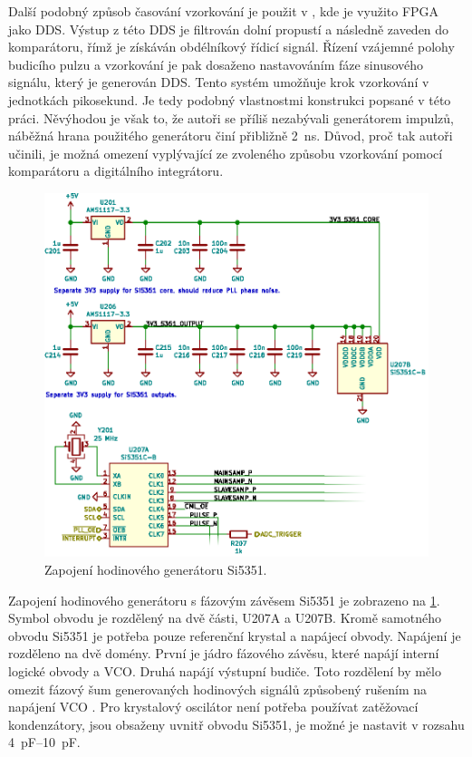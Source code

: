 Další podobný způsob časování vzorkování je použit v \cite{ddsfpgareflectometer}, kde je využito \acrshort{FPGA} jako \acrshort{DDS}. Výstup z této \acrshort{DDS} je filtrován dolní propustí a následně zaveden do komparátoru, římž je získáván obdélníkový řídicí signál. Řízení vzájemné polohy budicího pulzu a vzorkování je pak dosaženo nastavováním fáze sinusového signálu, který je generován \acrshort{DDS}. Tento systém umožňuje krok vzorkování v jednotkách pikosekund. Je tedy podobný vlastnostmi konstrukci popsané v této práci. Něvýhodou je však to, že autoři se příliš nezabývali generátorem impulzů, náběžná hrana použitého generátoru činí přibližně \SI{2}{ns}. Důvod, proč tak autoři učinili, je možná omezení vyplývající ze zvoleného způsobu vzorkování pomocí komparátoru a digitálního integrátoru.

\begin{figure}[htbp]
\includegraphics[width=\textwidth,keepaspectratio]{images/timing_section.eps}\caption{Zapojení hodinového generátoru Si5351.}\label{timing_section_schematic}
\end{figure}	

Zapojení hodinového generátoru s fázovým závěsem Si5351 je zobrazeno na \ref{timing_section_schematic}. Symbol obvodu je rozdělený na dvě části, U207A a U207B. Kromě samotného obvodu Si5351 je potřeba pouze referenční krystal a napájecí obvody. Napájení je rozděleno na dvě domény. První je jádro fázového závěsu, které napájí interní logické obvody a \acrshort{VCO}. Druhá napájí výstupní budiče. Toto rozdělení by mělo omezit fázový šum generovaných hodinových signálů způsobený rušením na napájení \acrshort{VCO} \cite{Si5351applicationnote}. Pro krystalový oscilátor není potřeba používat zatěžovací kondenzátory, jsou obsaženy uvnitř obvodu Si5351, je možné je nastavit v rozsahu \SIrange{4}{10}{\pico\farad}.

